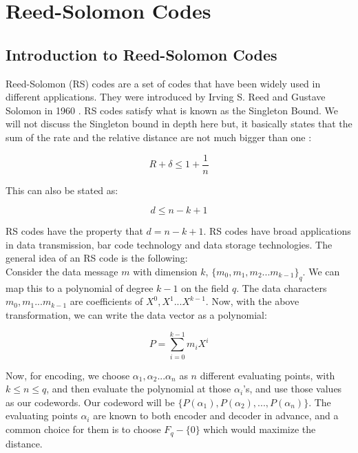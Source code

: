 \documentclass{article}
\begin{document}
\section{Reed-Solomon Codes}
\subsection{Introduction to Reed-Solomon Codes} 
Reed-Solomon (RS) codes are a set of codes that have been widely used in different applications. They were introduced by Irving S. Reed and Gustave Solomon in 1960 \cite{reed-solomon}. RS codes satisfy what is known as the Singleton Bound. We will not discuss the Singleton bound in depth here but, it basically states that the sum of the rate and the relative distance are not much bigger than one \cite{singleton}:

\begin{equation}
R + \delta \leq 1 + \frac{1}{n}
\end{equation}

\noindent This can also be stated as:

\begin{equation}
d \le n-k+1
\end{equation}

\noindent RS codes have the property that $d = n-k+1$.  RS codes have broad applications in data transmission, bar code technology and data storage technologies. The general idea of an RS code is the following:\\

Consider the data message $m$ with dimension $k$, $\{m_0, m_1,m_2...m_{k-1}\}_q$. We can map this to a polynomial of degree $k-1$ on the field $q$. The data characters $m_0, m_1 ...m_{k-1}$ are coefficients of $X^0, X^1...X^{k-1}$. Now, with the above transformation, we can write the data vector as a polynomial:

\begin{equation}
 P = \sum_{i=0}^{k-1}m_iX^i
\end{equation}

Now, for encoding, we choose $\alpha_1, \alpha_2...\alpha_n$ as $n$ different evaluating points, with $k \le n \le q$, and then evaluate the polynomial at those $\alpha_i$'s, and use those values as our codewords. Our codeword will be $\{P(\alpha_1), P(\alpha_2) , ... ,P(\alpha_n)\}$. The evaluating points $\alpha_i$ are known to both encoder and decoder in advance, and a common choice for them is to choose $F_q - \{0\}$ which would maximize the distance.
\end{document}
